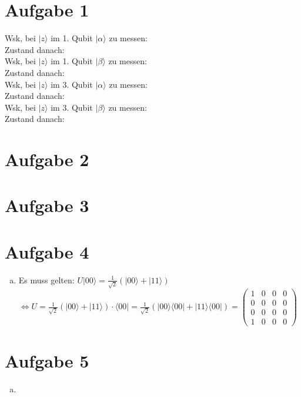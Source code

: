 \documentclass[a4paper]{scrartcl}
\begin{document}
\section*{Aufgabe 1}
Wsk, bei $|z\rangle$ im 1. Qubit $|\alpha\rangle$ zu messen:\\

Zustand danach:\\
Wsk, bei $|z\rangle$ im 1. Qubit $|\beta\rangle$ zu messen:\\

Zustand danach:\\
Wsk, bei $|z\rangle$ im 3. Qubit $|\alpha\rangle$ zu messen:\\

Zustand danach:\\
Wsk, bei $|z\rangle$ im 3. Qubit $|\beta\rangle$ zu messen:\\

Zustand danach:\\
\newpage
\section*{Aufgabe 2}


\newpage
\section*{Aufgabe 3}


\newpage
\section*{Aufgabe 4}
\begin{enumerate}[a)]

\item Es muss gelten: $U |00\rangle=\frac{1}{\sqrt{2}}(|00\rangle + |11\rangle )$\\
$\Leftrightarrow U = \frac{1}{\sqrt{2}}(|00 \rangle + |11\rangle)\cdot \langle 00|= \frac{1}{\sqrt{2}}(|00\rangle \langle 00|+|11\rangle \langle 00|)= \begin{pmatrix}
1&0&0&0\\
0&0&0&0\\
0&0&0&0\\
1&0&0&0
\end{pmatrix}$
\end{enumerate}
\newpage
\section*{Aufgabe 5}
\begin{enumerate}[a)]

\item
\end{enumerate}
\end{document}
